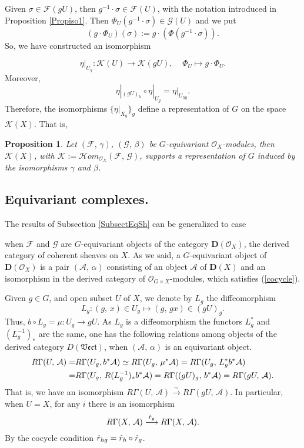 \documentclass[xypic,amscd,syntonly,amssymb,verbatim,12pt]{amsart}
\theoremstyle{plain}
\newtheorem{Prop}[Thm]{Proposition}
\theoremstyle{definition}
\theoremstyle{remark}
\numberwithin{equation}{section}
\begin{document}
 Given $\sigma\in
{\mathcal F}(gU)$, then $g^{-1}\cdot\sigma\in {\mathcal F}(U)$,
with the notation introduced in Proposition \ref{Propiso1}. Then
$\Phi_U(g^{-1}\cdot\sigma)\in {\mathcal G}(U)$ and we put
 \begin{equation}\label{gcdotP}
 (g\cdot\Phi_U)(\sigma):=g\cdot(\Phi(g^{-1}\cdot\sigma)).
 \end{equation}
 So, we have constructed an isomorphism
 
 $$  \eta|_{U_g} :{\mathcal K}(U)\longrightarrow
{\mathcal K}(gU),\;\; \;\;  \Phi_U\mapsto g\cdot \Phi_U.$$
Moreover,
$$   \eta|_{(gU)_h}\circ \eta|_{U_g}=\eta|_{U_{hg}}.$$
 Therefore, the isomorphisms $\{\eta|_{X_g}\}_g$ define a representation
of $G$ on the space ${\mathcal K}(X)$. That is,
\begin{Prop}\label{ProprepExt}  Let $({\mathcal F},\,\gamma)$, $({\mathcal
 G},\,\beta)$ be
 $G$-equivariant ${\mathcal O}_X$-modules, then ${\mathcal K}(X)$, with ${\mathcal K}:={\mathcal Hom}_{{\mathcal O}_X}({\mathcal
 F},\,{\mathcal G})$, supports a representation of $G$ induced by the isomorphisms $\gamma$ and $\beta$.
  \end{Prop}





\subsection{Equivariant complexes.}\label{SubsectEqCom}
 The  results of Subsection \ref{SubsectEqSh} can be generalized to  case
 
 when ${\mathcal F}$ and ${\mathcal G}$ are $G$-equivariant objects of the category ${\mathbf
 D}({\mathcal O}_X)$, the derived category of coherent sheaves on $X$. As we said, a $G$-equivariant object
  of ${\mathbf D}({\mathcal O}_X)$ is a pair $({\mathcal A},\,\alpha)$ consisting
of an object ${\mathcal A}$ of ${\mathbf
 D}(X)$ and an isomorphism in the derived category of ${\mathcal O}_{G\times
 X}$-modules, which satisfies (\ref{cocycle}).

Given $g\in G$,  and open subset $U$ of $X$,
 we denote by $L_g$ the diffeomorphism
$$L_g:(g,\,x)\in U_g\mapsto (g,\,gx)\in (gU)_g.$$
Thus, $b\circ L_g=\mu:U_g\to gU$. As $L_g$ is a diffeomorphism the
functors $L^*_g$ and $(L_g^{-1})_*$ are the same,
one has the following relations among objects of the
derived category $D(\mathfrak{Vect})$, when  $({\mathcal A},\,\alpha)$ is an equivariant object.
\begin{align}
  R\Gamma(U,\,{\mathcal A})=& R\Gamma(U_g, b^*{\mathcal A})\simeq
R\Gamma(U_g,\,\mu^*{\mathcal A})=R\Gamma(U_g,\,L_g^*b^*{\mathcal
A})  \notag \\
=& R\Gamma(U_g,\,R(L_g^{-1})_*b^*{\mathcal
A})=R\Gamma((gU)_g,\,b^*{\mathcal A})=R\Gamma(gU,\,{\mathcal
A}).\notag
\end{align}
That is, we have an isomorphism $R\Gamma(U,\,{\mathcal A})
\stackrel{\sim}{\longrightarrow} R\Gamma(gU,\,{\mathcal A}).$ In
particular, when $U=X$, for any $i$ there is an isomorphism
 $$R\Gamma(X,\,{\mathcal A})\stackrel{\Hat r_g}{\longrightarrow}
R\Gamma(X,\,{\mathcal A}).$$
 By the cocycle condition $\Hat r_{hg}=\Hat r_h\circ \Hat r_g$.
\end{document}
